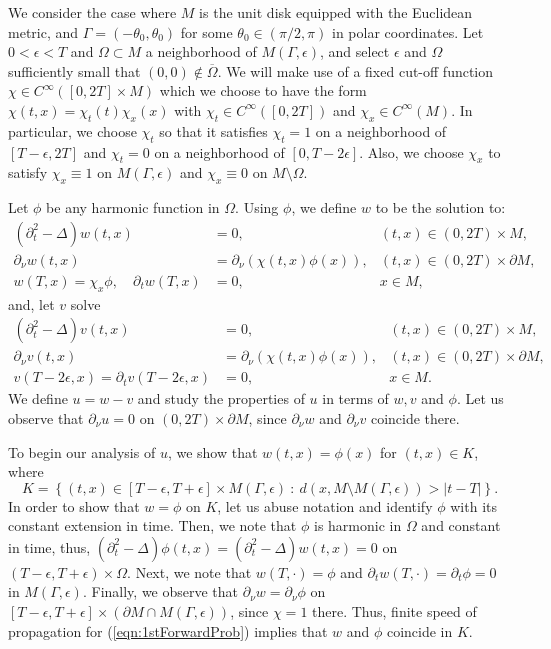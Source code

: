 \documentclass[final,leqno]{siamart1116}
\begin{document}
We consider the case where $M$ is the unit disk equipped with the
Euclidean metric, and $\Gamma = (-\theta_0, \theta_0)$ for some
$\theta_0 \in (\pi/2,\pi)$ in polar coordinates. Let $0 < \epsilon <
T$ and $\Omega \subset M$ a neighborhood of $M(\Gamma,\epsilon)$, and
select $\epsilon$ and $\Omega$ sufficiently small that $(0,0) \not \in
\overline{\Omega}$. We will make use of a fixed cut-off function $\chi \in
C^\infty([0,2T]\times M)$ which we choose to have the form $\chi(t,x)
= \chi_t(t) \chi_x(x)$ with $\chi_t \in C^\infty([0,2T])$ and $\chi_x
\in C^\infty(M)$. In particular, we choose $\chi_t$ so that it satisfies
$\chi_t = 1$ on a neighborhood of $[T-\epsilon,2T]$ and $\chi_t = 0$
on a neighborhood of $[0,T-2\epsilon]$. Also, we choose $\chi_x$
to satisfy $\chi_x \equiv 1$ on $M(\Gamma,\epsilon)$ and $\chi_x
\equiv 0$ on $M \setminus \Omega$.

Let $\phi$ be any harmonic function in $\Omega$. Using $\phi$, we
define $w$ to be the solution to:
\begin{align*}
  (\partial_t^2  - \Delta) w(t,x) &= 0, & (t,x) \in (0, 2T) \times M,\\ 
  {{\partial}_{\nu}} w(t,x) &= {{\partial}_{\nu}}(\chi(t,x) \phi(x)), & (t,x) \in(0,2T) \times {\partial} M, \\
  w(T,x) = \chi_x \phi,\quad\partial_t w(T,x) &= 0,  & x \in M,
\end{align*}
and, let $v$ solve
\begin{align*}
  (\partial_t^2 - \Delta) v(t,x) &= 0, & (t,x) \in (0, 2T) \times M,\\ 
  {{\partial}_{\nu}} v(t,x) &= {{\partial}_{\nu}}(\chi(t,x) \phi(x)), & (t,x) \in(0, 2T) \times {\partial} M, \\
    v(T-2\epsilon,x) = \partial_t v(T-2\epsilon,x) &= 0, & x \in M.
\end{align*}
We define $u = w - v$ and study the properties of $u$ in terms of $w,
v$ and $\phi$. Let us observe that ${\partial}_\nu u =
0 $ on $(0,2T)\times {\partial} M$, since ${\partial}_\nu w$ and ${\partial}_\nu v$ coincide
there.

To begin our analysis of $u$, we show that $w(t,x) = \phi(x)$ for
$(t,x) \in K$, where
\begin{equation*}
  K = \left\{(t,x) \in [T-\epsilon,T+\epsilon] \times M(\Gamma,\epsilon)~:~d(x, M \setminus M(\Gamma,\epsilon)) > \left|t - T\right|\right\}.
\end{equation*}
In order to show that $w = \phi$ on $K$, let us abuse notation and
identify $\phi$ with its constant extension in time. Then, we note
that $\phi$ is harmonic in $\Omega$ and constant in time, thus,
$({\partial}_t^2 - \Delta)\phi(t,x) = ({\partial}_t^2 - \Delta)w(t,x) = 0$ on
$(T-\epsilon,T+\epsilon) \times \Omega$.  Next, we note that $w(T,
\cdot) = \phi$ and ${\partial}_tw(T,\cdot) = {\partial}_t \phi = 0$ in
$M(\Gamma,\epsilon)$. Finally, we observe that ${\partial}_\nu w = {\partial}_\nu
\phi$ on $[T-\epsilon, T+\epsilon] \times ({\partial} M \cap
M(\Gamma,\epsilon))$, since $\chi = 1$ there. Thus, finite speed of
propagation for (\ref{eqn:1stForwardProb}) implies that $w$ and $\phi$
coincide in $K$.
\end{document}
